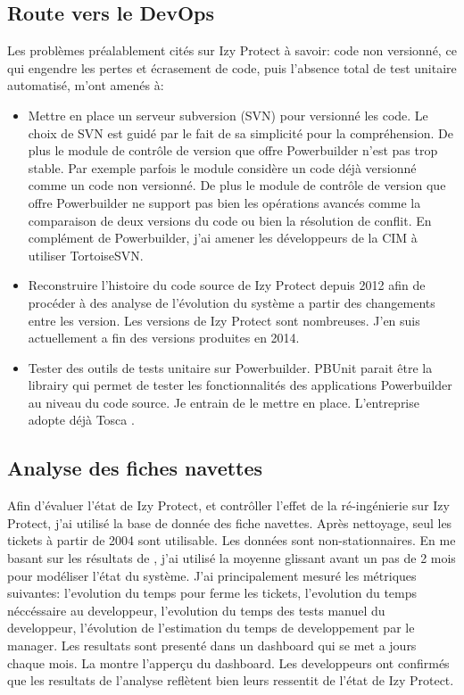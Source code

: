 \documentclass[a4paper]{article}
\begin{document}
\subsection{Route vers le DevOps}
\label{sec: devOps}
Les problèmes préalablement cités sur Izy Protect à savoir: code non versionné, ce qui engendre les pertes et écrasement de code, puis l'absence total de test unitaire automatisé, m'ont amenés à:
\begin{itemize}
\item Mettre en place un serveur subversion (SVN) pour versionné les code. 
Le choix de SVN est guidé par le fait  de sa simplicité  pour la compréhension.  
De plus le module de contrôle de version que offre Powerbuilder n'est pas trop stable. 
Par exemple parfois le module considère un code déjà versionné comme un code non versionné.
 De plus le module de contrôle de version que offre Powerbuilder ne support pas bien les opérations avancés comme la comparaison de deux versions du code ou bien la résolution de conflit. En complément de Powerbuilder,  j'ai amener les développeurs de la CIM à utiliser TortoiseSVN.
\item Reconstruire l'histoire du code source de Izy Protect depuis 2012 afin de procéder à des analyse de l'évolution du système a partir des changements entre les version. Les versions de Izy Protect sont nombreuses. J'en suis actuellement a fin des versions produites en 2014.
\item Tester  des outils de tests unitaire sur Powerbuilder. PBUnit parait être la librairy qui permet de tester  les fonctionnalités des applications Powerbuilder au niveau du code source. 
Je entrain de le mettre en place.
 L'entreprise adopte déjà Tosca . 
\end{itemize}

\subsection{Analyse des fiches navettes}
\label{sec:analyseDesFichesNavettes}
Afin d'évaluer l'état de Izy Protect, et contrôller l'effet de la ré-ingénierie sur Izy Protect,
 j'ai utilisé la base de donnée des fiche navettes. 
Après nettoyage, seul les tickets à partir de 2004 sont utilisable. 
Les données sont non-stationnaires. 
En me basant sur les résultats de \cite{Raja09}, j'ai utilisé la moyenne glissant avant un pas de 2 mois pour modéliser l'état du système.
J'ai principalement mesuré les métriques suivantes: l'evolution du temps pour ferme les tickets, l'evolution du temps néccéssaire au developpeur, l'evolution du temps des tests manuel du developpeur,
l'évolution de l'estimation du temps de developpement par le manager.
Les resultats sont presenté dans un dashboard qui se met a jours chaque mois.
La  montre l'apperçu du dashboard.
Les developpeurs ont confirmés que les resultats de l'analyse reflètent bien leurs ressentit de l'état de Izy Protect. 
\end{document}
